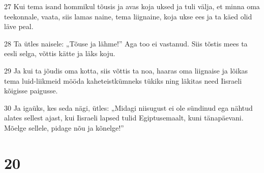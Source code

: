 \par 27 Kui tema isand hommikul tõusis ja avas koja uksed ja tuli välja, et minna oma teekonnale, vaata, siis lamas naine, tema liignaine, koja ukse ees ja ta käed olid läve peal.
\par 28 Ta ütles naisele: „Tõuse ja lähme!” Aga too ei vastanud. Siis tõstis mees ta eesli selga, võttis kätte ja läks koju.
\par 29 Ja kui ta jõudis oma kotta, siis võttis ta noa, haaras oma liignaise ja lõikas tema luid-liikmeid mööda kaheteistkümneks tükiks ning läkitas need Iisraeli kõigisse paigusse.
\par 30 Ja igaüks, kes seda nägi, ütles: „Midagi niisugust ei ole sündinud ega nähtud alates sellest ajast, kui Iisraeli lapsed tulid Egiptusemaalt, kuni tänapäevani. Mõelge sellele, pidage nõu ja kõnelge!”

\chapter{20}

